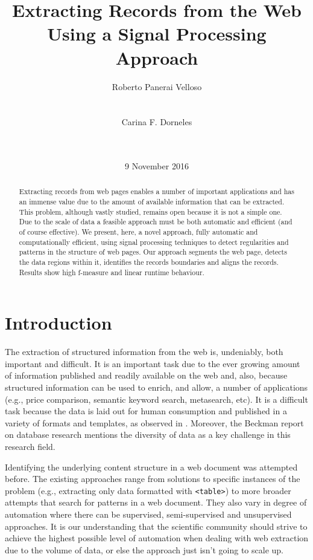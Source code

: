 \documentclass{vldb}
\title{Extracting Records from the Web Using a Signal Processing Approach}
\author{
\alignauthor
Roberto Panerai Velloso\\
       \affaddr{Universidade Federal de Santa Catarina}\\
       \affaddr{Florianópolis (SC), Brazil}\\
       \email{rvelloso@gmail.com}
\alignauthor
Carina F. Dorneles\\
       \affaddr{Universidade Federal de Santa Catarina}\\
       \affaddr{Florianópolis (SC), Brazil}\\
       \email{dorneles@inf.ufsc.br}
}
\date{9 November 2016}
\begin{document}

\maketitle

\begin{abstract}
Extracting records from web pages enables a number of important
applications and has an immense value due to the amount of available information
that can be extracted. This problem, although vastly studied, remains open
because it is not a simple one. Due to the scale of data a feasible approach
must be both automatic and efficient (and of course effective). We present,
here, a novel approach, fully automatic and computationally efficient, using
signal processing techniques to detect regularities and patterns in the
structure of web pages. Our approach segments the web page, detects the data
regions within it, identifies the records boundaries and aligns the records.
Results show high f-measure and linear runtime behaviour.
\end{abstract}

\section{Introduction}

The extraction of structured information from the web is, undeniably, both
important and difficult. It is an important task due to the ever growing amount
of information published and readily available on the web and, also, because
structured information can be used to enrich, and allow, a number of
applications (e.g., price comparison, semantic keyword search, metasearch, etc).
It is a difficult task because the data is laid out for human consumption and
published in a variety of formats and templates, as observed in
\cite{structured2011}. Moreover, the Beckman report on database
research\cite{abadi2014beckman} mentions the diversity of data as a key
challenge in this research field.

Identifying the underlying content structure in a web document was attempted
before. The existing approaches range from solutions to specific instances of
the problem (e.g., extracting only data formatted with
\texttt{<table>}\cite{webtables2008}) to more broader attempts that search for
patterns in a web document\cite{MDR03}. They also vary in degree of automation
where there can be supervised, semi-supervised and unsupervised approaches. It
is our understanding that the scientific community should strive to achieve the
highest possible level of automation when dealing with web extraction due
to the volume of data, or else the approach just isn't going to scale up.
\end{document}
